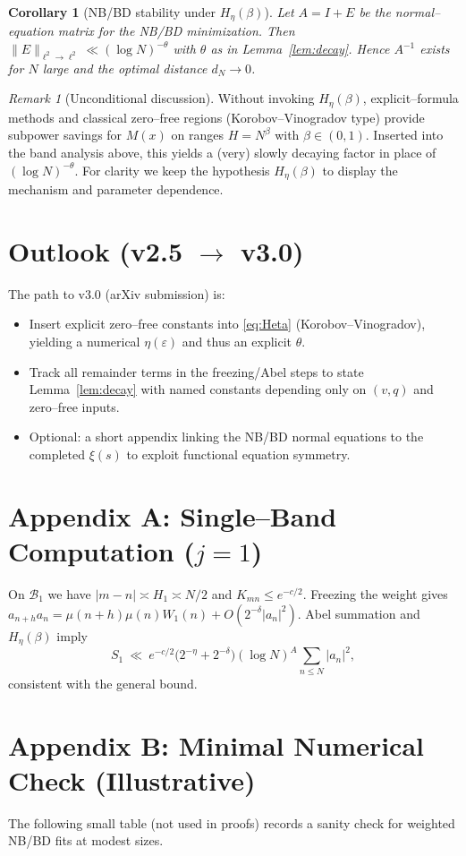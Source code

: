 \documentclass[11pt]{article}
\newtheorem{corollary}{Corollary}
\theoremstyle{remark}
\newtheorem{remark}{Remark}
\begin{document}
\begin{corollary}[NB/BD stability under $H_\eta(\beta)$]
Let $A=I+E$ be the normal--equation matrix for the NB/BD minimization.
Then $\|E\|_{\ell^2\to\ell^2}\ll (\log N)^{-\theta}$ with $\theta$ as in Lemma~\ref{lem:decay}.
Hence $A^{-1}$ exists for $N$ large and the optimal distance $d_N\to 0$.
\end{corollary}

\begin{remark}[Unconditional discussion]
Without invoking $H_\eta(\beta)$, explicit--formula methods and classical zero--free regions (Korobov--Vinogradov type) provide subpower savings for $M(x)$ on ranges $H=N^{\beta}$ with $\beta\in(0,1)$.
Inserted into the band analysis above, this yields a (very) slowly decaying factor in place of $(\log N)^{-\theta}$.
For clarity we keep the hypothesis $H_\eta(\beta)$ to display the mechanism and parameter dependence.
\end{remark}

\section{Outlook (v2.5 $\to$ v3.0)}
The path to v3.0 (arXiv submission) is:
\begin{itemize}
\item Insert explicit zero--free constants into \eqref{eq:Heta} (Korobov--Vinogradov), yielding a numerical $\eta(\varepsilon)$ and thus an explicit $\theta$.
\item Track all remainder terms in the freezing/Abel steps to state Lemma~\ref{lem:decay} with named constants depending only on $(v,q)$ and zero--free inputs.
\item Optional: a short appendix linking the NB/BD normal equations to the completed $\xi(s)$ to exploit functional equation symmetry.
\end{itemize}

\appendix
\section*{Appendix A: Single--Band Computation ($j=1$)}
On $\mathcal{B}_1$ we have $|m-n|\asymp H_1\asymp N/2$ and $K_{mn}\le e^{-c/2}$.
Freezing the weight gives $a_{n+h}a_n=\mu(n+h)\mu(n)W_1(n)+O(2^{-\delta}|a_n|^2)$.
Abel summation and $H_\eta(\beta)$ imply
\[
S_1\ \ll\ e^{-c/2}\Big(2^{-\eta}+2^{-\delta}\Big)(\log N)^A\sum_{n\le N}|a_n|^2,
\]
consistent with the general bound.

\section*{Appendix B: Minimal Numerical Check (Illustrative)}
The following small table (not used in proofs) records a sanity check for weighted NB/BD fits at modest sizes.
\end{document}
